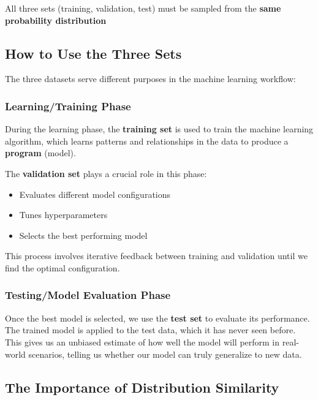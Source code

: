 \documentclass[11pt,a4paper]{article}
\theoremstyle{definition}
\theoremstyle{plain}
\theoremstyle{remark}
\begin{document}
\begin{tcolorbox}[colback=yellow!10!white,colframe=yellow!75!black,title=\textbf{Critical Requirement}]
All three sets (training, validation, test) must be sampled from the \textbf{same probability distribution}
\end{tcolorbox}

\subsection{How to Use the Three Sets}

The three datasets serve different purposes in the machine learning workflow:

\subsubsection{Learning/Training Phase}

During the learning phase, the \textbf{training set} is used to train the machine learning algorithm, which learns patterns and relationships in the data to produce a \textbf{program} (model). 

The \textbf{validation set} plays a crucial role in this phase:
\begin{itemize}
    \item Evaluates different model configurations
    \item Tunes hyperparameters
    \item Selects the best performing model
\end{itemize}

This process involves iterative feedback between training and validation until we find the optimal configuration.

\subsubsection{Testing/Model Evaluation Phase}

Once the best model is selected, we use the \textbf{test set} to evaluate its performance. The trained model is applied to the test data, which it has never seen before. This gives us an unbiased estimate of how well the model will perform in real-world scenarios, telling us whether our model can truly generalize to new data.

\subsection{The Importance of Distribution Similarity}
\end{document}
